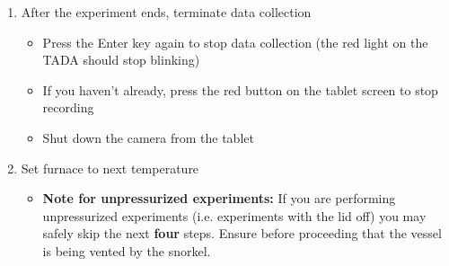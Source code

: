 \documentclass[letterpaper,11pt]{article}
\begin{document}
\begin{enumerate}
    \item After the experiment ends, terminate data collection
        \begin{itemize}
        \item Press the Enter key  again to stop data 
            collection (the red light on the TADA should stop blinking)
        \item If you haven't already, press the red button on the tablet screen 
        to stop recording
        \item Shut down the camera from the tablet
        \end{itemize}
        
    \item Set furnace to next temperature
        \begin{itemize}
        \item \textbf{Note for unpressurized experiments:} If you are performing
            unpressurized experiments (i.e. experiments with the lid off) you
            may safely skip the next \textbf{four} steps. Ensure before 
            proceeding that the vessel is being vented by the snorkel.
        \end{itemize}


\end{enumerate}
\end{document}
